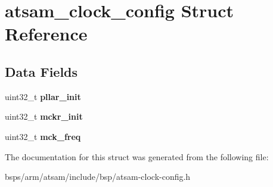 \hypertarget{structatsam__clock__config}{}\section{atsam\+\_\+clock\+\_\+config Struct Reference}
\label{structatsam__clock__config}
\subsection*{Data Fields}
\begin{DoxyCompactItemize}
\item 
\mbox{\label{structatsam__clock__config_a0d9460ec005cf5387173c624c4e531a1}} 
uint32\+\_\+t {\bfseries pllar\+\_\+init}
\item 
\mbox{\label{structatsam__clock__config_a4edbc36f0ecf2c314f70df58ee9ebc50}} 
uint32\+\_\+t {\bfseries mckr\+\_\+init}
\item 
\mbox{\label{structatsam__clock__config_ae67307bdbbbea9c4db76c9318f9be619}} 
uint32\+\_\+t {\bfseries mck\+\_\+freq}
\end{DoxyCompactItemize}


The documentation for this struct was generated from the following file\+:\begin{DoxyCompactItemize}
\item 
bsps/arm/atsam/include/bsp/atsam-\/clock-\/config.\+h\end{DoxyCompactItemize}
